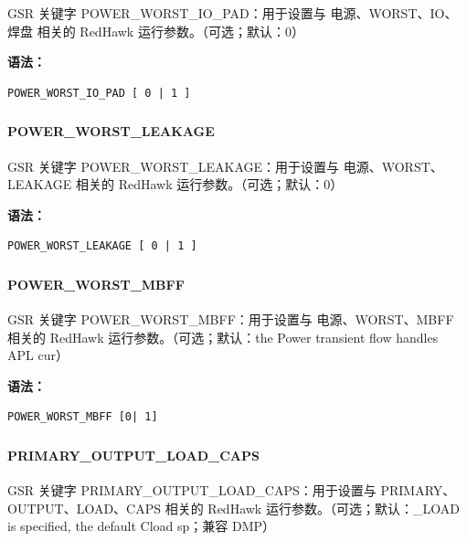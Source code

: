 GSR 关键字 POWER_WORST_IO_PAD：用于设置与 电源、WORST、IO、焊盘 相关的 RedHawk 运行参数。（可选；默认：0）

\textbf{语法：}
\begin{lstlisting}
POWER_WORST_IO_PAD [ 0 | 1 ]
\end{lstlisting}

\subsubsection{}
\paragraph*{POWER_WORST_LEAKAGE}

GSR 关键字 POWER_WORST_LEAKAGE：用于设置与 电源、WORST、LEAKAGE 相关的 RedHawk 运行参数。（可选；默认：0）

\textbf{语法：}
\begin{lstlisting}
POWER_WORST_LEAKAGE [ 0 | 1 ]
\end{lstlisting}

\subsubsection{}
\paragraph*{POWER_WORST_MBFF}

GSR 关键字 POWER_WORST_MBFF：用于设置与 电源、WORST、MBFF 相关的 RedHawk 运行参数。（可选；默认：the Power transient flow handles APL cur）

\textbf{语法：}
\begin{lstlisting}
POWER_WORST_MBFF [0| 1]
\end{lstlisting}

\subsubsection{}
\paragraph*{PRIMARY_OUTPUT_LOAD_CAPS}

GSR 关键字 PRIMARY_OUTPUT_LOAD_CAPS：用于设置与 PRIMARY、OUTPUT、LOAD、CAPS 相关的 RedHawk 运行参数。（可选；默认：_LOAD is specified, the default Cload sp；兼容 DMP）

